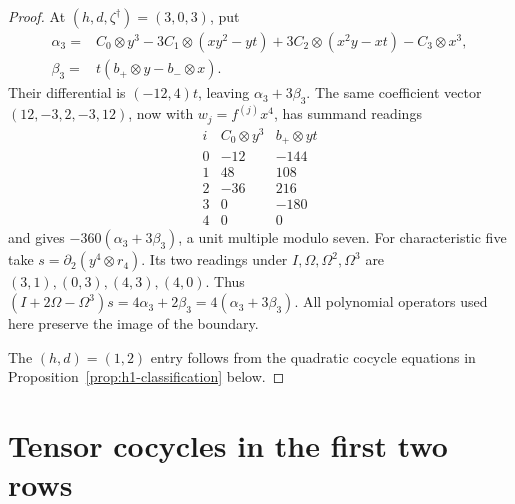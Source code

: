 \documentclass[11pt]{article}
\theoremstyle{plain}
\theoremstyle{definition}
\theoremstyle{remark}
\numberwithin{equation}{section}
\begin{document}
\begin{proof}
At \((h,d,\zeta^\dagger)=(3,0,3)\), put
\begin{align*}
 \alpha_3={}&C_0\otimes y^3-3C_1\otimes(xy^2-yt)
          +3C_2\otimes(x^2y-xt)-C_3\otimes x^3,\\
 \beta_3={}&t(b_+\otimes y-b_-\otimes x).
\end{align*}
Their differential is \((-12,4)t\), leaving \(\alpha_3+3\beta_3\).
The same coefficient vector \((12,-3,2,-3,12)\), now with
\(w_j=f^{(j)}x^4\), has summand readings
\[
\begin{array}{c|rr}
 i&C_0\otimes y^3&b_+\otimes yt\\\hline
 0&-12&-144\\
 1&48&108\\
 2&-36&216\\
 3&0&-180\\
 4&0&0
\end{array}
\]
and gives \(-360(\alpha_3+3\beta_3)\), a unit multiple modulo seven.
For characteristic five take \(s=\partial_2(y^4\otimes r_4)\).
Its two readings under \(I,\Omega,\Omega^2,\Omega^3\) are
\((3,1),(0,3),(4,3),(4,0)\).
Thus \((I+2\Omega-\Omega^3)s=4\alpha_3+2\beta_3
=4(\alpha_3+3\beta_3)\).
All polynomial operators used here preserve the image of the boundary.

The \((h,d)=(1,2)\) entry follows from the quadratic cocycle equations
in Proposition~\ref{prop:h1-classification} below.
\end{proof}



\section{Tensor cocycles in the first two rows}\label{sec:first-two}
\end{document}
